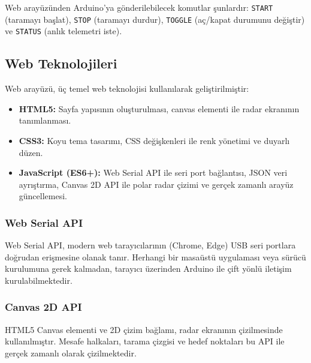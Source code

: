 Web arayüzünden Arduino'ya gönderilebilecek komutlar şunlardır: \texttt{START} (taramayı başlat), \texttt{STOP} (taramayı durdur), \texttt{TOGGLE} (aç/kapat durumunu değiştir) ve \texttt{STATUS} (anlık telemetri iste).

\subsection{Web Teknolojileri}

Web arayüzü, üç temel web teknolojisi kullanılarak geliştirilmiştir:

\begin{itemize}
    \item \textbf{HTML5:} Sayfa yapısının oluşturulması, canvas elementi ile radar ekranının tanımlanması.
    \item \textbf{CSS3:} Koyu tema tasarımı, CSS değişkenleri ile renk yönetimi ve duyarlı düzen.
    \item \textbf{JavaScript (ES6+):} Web Serial API ile seri port bağlantısı, JSON veri ayrıştırma, Canvas 2D API ile polar radar çizimi ve gerçek zamanlı arayüz güncellemesi.
\end{itemize}

\subsubsection{Web Serial API}

Web Serial API, modern web tarayıcılarının (Chrome, Edge) USB seri portlara doğrudan erişmesine olanak tanır. Herhangi bir masaüstü uygulaması veya sürücü kurulumuna gerek kalmadan, tarayıcı üzerinden Arduino ile çift yönlü iletişim kurulabilmektedir.

\subsubsection{Canvas 2D API}

HTML5 Canvas elementi ve 2D çizim bağlamı, radar ekranının çizilmesinde kullanılmıştır. Mesafe halkaları, tarama çizgisi ve hedef noktaları bu API ile gerçek zamanlı olarak çizilmektedir.
